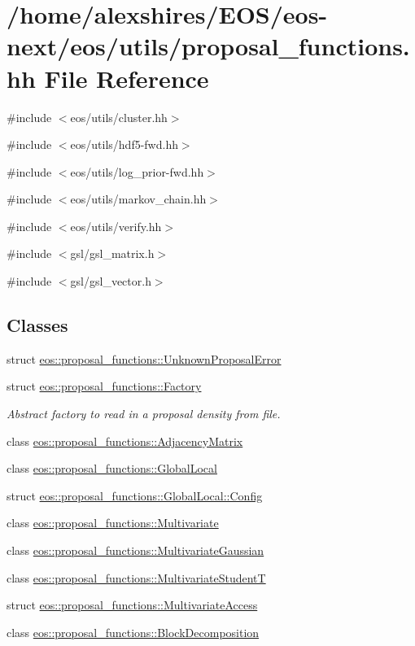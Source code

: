 \hypertarget{proposal__functions_8hh}{
\section{/home/alexshires/EOS/eos-\/next/eos/utils/proposal\_\-functions.hh File Reference}
\label{proposal__functions_8hh}
}
{\ttfamily \#include $<$eos/utils/cluster.hh$>$}\par
{\ttfamily \#include $<$eos/utils/hdf5-\/fwd.hh$>$}\par
{\ttfamily \#include $<$eos/utils/log\_\-prior-\/fwd.hh$>$}\par
{\ttfamily \#include $<$eos/utils/markov\_\-chain.hh$>$}\par
{\ttfamily \#include $<$eos/utils/verify.hh$>$}\par
{\ttfamily \#include $<$gsl/gsl\_\-matrix.h$>$}\par
{\ttfamily \#include $<$gsl/gsl\_\-vector.h$>$}\par
\subsection*{Classes}
\begin{DoxyCompactItemize}
\item 
struct \hyperlink{structeos_1_1proposal__functions_1_1UnknownProposalError}{eos::proposal\_\-functions::UnknownProposalError}
\item 
struct \hyperlink{structeos_1_1proposal__functions_1_1Factory}{eos::proposal\_\-functions::Factory}
\begin{DoxyCompactList}\small\item\em Abstract factory to read in a proposal density from file. \item\end{DoxyCompactList}\item 
class \hyperlink{classeos_1_1proposal__functions_1_1AdjacencyMatrix}{eos::proposal\_\-functions::AdjacencyMatrix}
\item 
class \hyperlink{classeos_1_1proposal__functions_1_1GlobalLocal}{eos::proposal\_\-functions::GlobalLocal}
\item 
struct \hyperlink{structeos_1_1proposal__functions_1_1GlobalLocal_1_1Config}{eos::proposal\_\-functions::GlobalLocal::Config}
\item 
class \hyperlink{classeos_1_1proposal__functions_1_1Multivariate}{eos::proposal\_\-functions::Multivariate}
\item 
class \hyperlink{classeos_1_1proposal__functions_1_1MultivariateGaussian}{eos::proposal\_\-functions::MultivariateGaussian}
\item 
class \hyperlink{classeos_1_1proposal__functions_1_1MultivariateStudentT}{eos::proposal\_\-functions::MultivariateStudentT}
\item 
struct \hyperlink{structeos_1_1proposal__functions_1_1MultivariateAccess}{eos::proposal\_\-functions::MultivariateAccess}
\item 
class \hyperlink{classeos_1_1proposal__functions_1_1BlockDecomposition}{eos::proposal\_\-functions::BlockDecomposition}
\end{DoxyCompactItemize}
